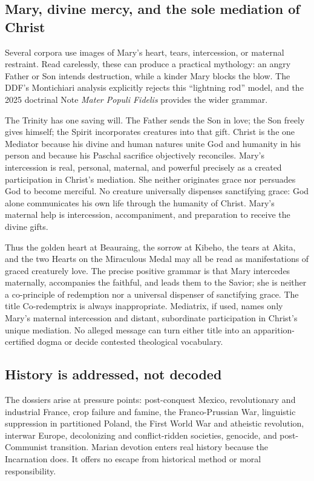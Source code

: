 \subsection{Mary, divine mercy, and the sole mediation of Christ}

Several corpora use images of Mary's heart, tears, intercession, or maternal restraint. Read carelessly, these can produce a practical mythology: an angry Father or Son intends destruction, while a kinder Mary blocks the blow. The DDF's Montichiari analysis explicitly rejects this ``lightning rod'' model, and the 2025 doctrinal Note \emph{Mater Populi Fidelis} provides the wider grammar.

The Trinity has one saving will. The Father sends the Son in love; the Son freely gives himself; the Spirit incorporates creatures into that gift. Christ is the one Mediator because his divine and human natures unite God and humanity in his person and because his Paschal sacrifice objectively reconciles. Mary's intercession is real, personal, maternal, and powerful precisely as a created participation in Christ's mediation. She neither originates grace nor persuades God to become merciful. No creature universally dispenses sanctifying grace: God alone communicates his own life through the humanity of Christ. Mary's maternal help is intercession, accompaniment, and preparation to receive the divine gifts.

Thus the golden heart at Beauraing, the sorrow at Kibeho, the tears at Akita, and the two Hearts on the Miraculous Medal may all be read as manifestations of graced creaturely love. The precise positive grammar is that Mary intercedes maternally, accompanies the faithful, and leads them to the Savior; she is neither a co-principle of redemption nor a universal dispenser of sanctifying grace. The title Co-redemptrix is always inappropriate. Mediatrix, if used, names only Mary's maternal intercession and distant, subordinate participation in Christ's unique mediation. No alleged message can turn either title into an apparition-certified dogma or decide contested theological vocabulary.

\subsection{History is addressed, not decoded}

The dossiers arise at pressure points: post-conquest Mexico, revolutionary and industrial France, crop failure and famine, the Franco-Prussian War, linguistic suppression in partitioned Poland, the First World War and atheistic revolution, interwar Europe, decolonizing and conflict-ridden societies, genocide, and post-Communist transition. Marian devotion enters real history because the Incarnation does. It offers no escape from historical method or moral responsibility.

